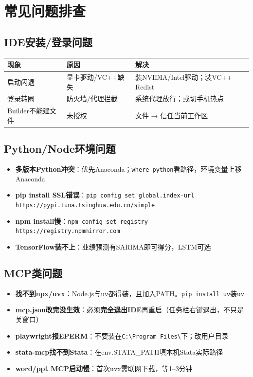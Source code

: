 \section{常见问题排查}

\subsection{IDE安装/登录问题}

\begin{table}[H]
\centering
\begin{tabular}{lp{3.5cm}p{5.5cm}}
\toprule
\textbf{现象} & \textbf{原因} & \textbf{解决} \\
\midrule
启动闪退 & 显卡驱动/VC++缺失 & 装NVIDIA/Intel驱动；装VC++ Redist \\
登录转圈 & 防火墙/代理拦截 & 系统代理放行；或切手机热点 \\
Builder不能建文件 & 未授权 & 文件 → 信任当前工作区 \\
\bottomrule
\end{tabular}
\end{table}

\subsection{Python/Node环境问题}

\begin{itemize}[leftmargin=2em]
  \item \textbf{多版本Python冲突}：优先Anaconda；\texttt{where python}看路径，环境变量上移Anaconda
  \item \textbf{pip install SSL错误}：\texttt{pip config set global.index-url https://pypi.tuna.tsinghua.edu.cn/simple}
  \item \textbf{npm install慢}：\texttt{npm config set registry https://registry.npmmirror.com}
  \item \textbf{TensorFlow装不上}：业绩预测有SARIMA即可得分，LSTM可选
\end{itemize}

\subsection{MCP类问题}

\begin{itemize}[leftmargin=2em]
  \item \textbf{找不到npx/uvx}：Node.js与uv都得装，且加入PATH。\texttt{pip install uv}装uv
  \item \textbf{mcp.json改完没生效}：必须\textbf{完全退出IDE}再重启（任务栏右键退出，不只是关窗口）
  \item \textbf{playwright报EPERM}：不要装在\texttt{C:\textbackslash Program Files\textbackslash}下；改用户目录
  \item \textbf{stata-mcp找不到Stata}：在env.STATA\_PATH填本机Stata实际路径
  \item \textbf{word/ppt MCP启动慢}：首次uvx需联网下载，等1--3分钟
\end{itemize}

